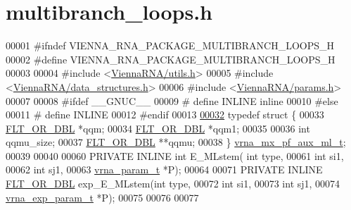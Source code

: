 \hypertarget{multibranch__loops_8h_source}{}\section{multibranch\+\_\+loops.\+h}
\label{multibranch__loops_8h_source}

\begin{DoxyCode}
00001 \textcolor{preprocessor}{#ifndef VIENNA\_RNA\_PACKAGE\_MULTIBRANCH\_LOOPS\_H}
00002 \textcolor{preprocessor}{#define VIENNA\_RNA\_PACKAGE\_MULTIBRANCH\_LOOPS\_H}
00003 
00004 \textcolor{preprocessor}{#include <\hyperlink{utils_8h}{ViennaRNA/utils.h}>}
00005 \textcolor{preprocessor}{#include <\hyperlink{data__structures_8h}{ViennaRNA/data\_structures.h}>}
00006 \textcolor{preprocessor}{#include <\hyperlink{params_8h}{ViennaRNA/params.h}>}
00007 
00008 \textcolor{preprocessor}{#ifdef \_\_GNUC\_\_}
00009 \textcolor{preprocessor}{# define INLINE inline}
00010 \textcolor{preprocessor}{#else}
00011 \textcolor{preprocessor}{# define INLINE}
00012 \textcolor{preprocessor}{#endif}
00013 
\hypertarget{multibranch__loops_8h_source.tex_l00032}{}\hyperlink{group__loops}{00032} \textcolor{keyword}{typedef} \textcolor{keyword}{struct }\{
00033   \hyperlink{group__data__structures_ga31125aeace516926bf7f251f759b6126}{FLT\_OR\_DBL}  *qqm;
00034   \hyperlink{group__data__structures_ga31125aeace516926bf7f251f759b6126}{FLT\_OR\_DBL}  *qqm1;
00035 
00036   \textcolor{keywordtype}{int}         qqmu\_size;
00037   \hyperlink{group__data__structures_ga31125aeace516926bf7f251f759b6126}{FLT\_OR\_DBL}  **qqmu;
00038 \} \hyperlink{group__loops_structvrna__mx__pf__aux__ml__t}{vrna\_mx\_pf\_aux\_ml\_t};
00039 
00040 
00060 PRIVATE INLINE \textcolor{keywordtype}{int} E\_MLstem( \textcolor{keywordtype}{int} type,
00061                               \textcolor{keywordtype}{int} si1,
00062                               \textcolor{keywordtype}{int} sj1,
00063                               \hyperlink{group__energy__parameters_structvrna__param__s}{vrna\_param\_t} *P);
00064 
00071 PRIVATE INLINE \hyperlink{group__data__structures_ga31125aeace516926bf7f251f759b6126}{FLT\_OR\_DBL} exp\_E\_MLstem(\textcolor{keywordtype}{int} type,
00072                                     \textcolor{keywordtype}{int} si1,
00073                                     \textcolor{keywordtype}{int} sj1,
00074                                     \hyperlink{group__energy__parameters_structvrna__exp__param__s}{vrna\_exp\_param\_t} *P);
00075 
00076 
00077 

\end{DoxyCode}
